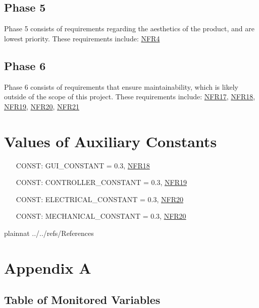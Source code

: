 \documentclass[12pt]{article}
\newcounter{constnum} %
\begin{document}
\subsection{Phase 5}
Phase 5 consists of requirements regarding the aesthetics of the product, and are lowest priority. These requirements include: \hyperref[NFR4]{NFR4}

\subsection{Phase 6}
Phase 6 consists of requirements that ensure maintainability, which is likely outside of the scope of this project. These requirements include: \hyperref[NFR17]{NFR17}, \hyperref[NFR18]{NFR18}, \hyperref[NFR19]{NFR19}, \hyperref[NFR20]{NFR20}, \hyperref[NFR21]{NFR21}

\section{Values of Auxiliary Constants}

\begin{itemize}
\item[CONST\refstepcounter{constnum}\theconstnum\label{LC_meaningfulLabel}:] GUI\_CONSTANT = 0.3, \hyperref[NFR18]{NFR18}
\item[CONST\refstepcounter{constnum}\theconstnum\label{LC_meaningfulLabel}:] CONTROLLER\_CONSTANT = 0.3, \hyperref[NFR19]{NFR19}
\item[CONST\refstepcounter{constnum}\theconstnum\label{LC_meaningfulLabel}:] ELECTRICAL\_CONSTANT = 0.3, \hyperref[NFR20]{NFR20}
\item[CONST\refstepcounter{constnum}\theconstnum\label{LC_meaningfulLabel}:] MECHANICAL\_CONSTANT = 0.3, \hyperref[NFR21]{NFR20}
\end{itemize}

\newpage

 {plainnat}
 {../../refs/References}

\newpage

\newpage{}
\section{Appendix A}

\subsection{Table of Monitored Variables}
\end{document}
